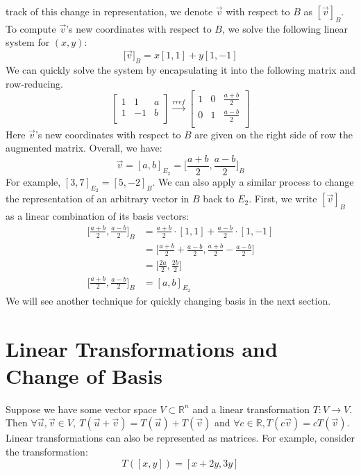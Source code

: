 \documentclass[11pt]{amsart}
\theoremstyle{definition}
\newcommand{\reals}{\mathbb{R}}
\begin{document}
track of this change in representation, we denote $\vec{v}$ with respect to $B$ as $[ \vec{v} ]_B$. To compute $\vec{v}$'s new coordinates with
respect to $B$, we solve the following linear system for $(x, y)$:
\[
	\big[ \vec{v} \big]_B = x[1, 1] + y[1, -1]
\]
We can quickly solve the system by encapsulating it into the following matrix and row-reducing.
\[
\left[\begin{array}{cc|c}
1 & 1 &  a \\
1 & -1 & b \\
\end{array}\right]
\xrightarrow{rref}
\left[\begin{array}{cc|c}
1 & 0 &  \frac{a + b}{2} \\
0 & 1 & \frac{a - b}{2} \\
\end{array}\right]
\]
Here $\vec{v}$'s new coordinates with respect to $B$ are given on the right side of row the augmented matrix. Overall, we have:
\[
	\vec{v} = [a, b]_{E_2} = \Big[\frac{a + b}{2}, \frac{a - b}{2}\Big]_{B}
\]
For example, $[3, 7]_{E_2} = [5, -2]_{B}$. We can also apply a similar process to change the representation of an arbitrary vector in $B$ back
to $E_2$. First, we write $[ \vec{v} ]_B$ as a linear combination of its basis vectors:
\begin{align*}
	\Big[\frac{a + b}{2}, \frac{a - b}{2}\Big]_{B} &= \frac{a + b}{2} \cdot [1, 1] + \frac{a - b}{2} \cdot [1, -1] \\
	&= \Big[ \frac{a + b}{2} + \frac{a - b}{2}, \frac{a + b}{2} - \frac{a - b}{2} \Big] \\
	&= \Big[ \frac{2a}{2}, \frac{2b}{2} \Big] \\
	\Big[\frac{a + b}{2}, \frac{a - b}{2}\Big]_{B} &= [a, b]_{E_2}
\end{align*}
We will see another technique for quickly changing basis in the next section.

\newpage
\section{Linear Transformations and Change of Basis}
Suppose we have some vector space $V \subset \reals^n$ and a linear transformation $T: V \to V$. Then
$\forall \vec{u}, \vec{v} \in V, \: T(\vec{u} + \vec{v}) = T(\vec{u}) + T(\vec{v})$ and $\forall c \in \reals, T(c \vec{v}) = c T(\vec{v})$. 
Linear transformations can also be represented as matrices. For example, consider the transformation:
\[
	T([x, y]) = [x + 2y, 3y]
\]
\end{document}
